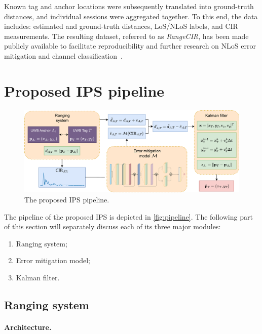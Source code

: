 Known tag and anchor locations were subsequently translated into ground-truth distances, and individual sessions were aggregated together. To this end, the data includes: estimated and ground-truth distances, LoS/NLoS labels, and CIR measurements. The resulting dataset, referred to as \textit{RangeCIR}, has been made publicly available to facilitate reproducibility and further research on NLoS error mitigation and channel classification~\cite{yaroshevych_2025_rangecir}.

\section{Proposed IPS pipeline}

\begin{figure}[tbh]
\includegraphics[width=\textwidth]{Figures/methodology/pipeline.pdf}
\centering
\caption{The proposed IPS pipeline.}
\label{fig:pipeline}
\end{figure}

The pipeline of the proposed IPS is depicted in \autoref{fig:pipeline}. The following part of this section will separately discuss each of its three major modules: 

\begin{enumerate}
    \item Ranging system;
    \item Error mitigation model;
    \item Kalman filter.
\end{enumerate}


\subsection{Ranging system}\label{ranging_system}

\paragraph{Architecture.}

